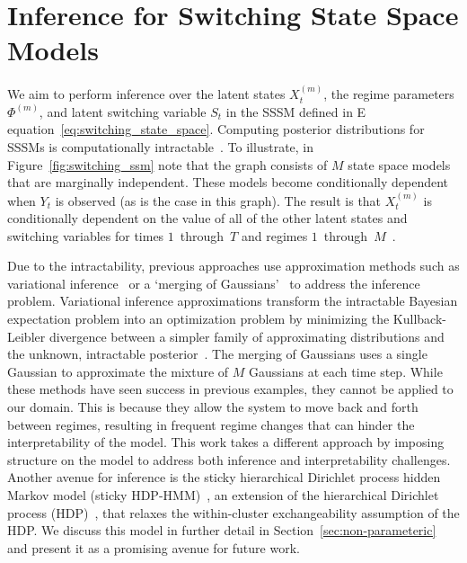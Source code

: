 \section{Inference for Switching State Space Models}\label{sec:inference_for_sssm}
We aim to perform inference over the latent states $X_t^{(m)}$, the regime parameters $\Phi^{(m)}$, and latent switching variable $S_t$ in the SSSM defined in E
equation~\ref{eq:switching_state_space}. Computing posterior distributions for SSSMs is computationally intractable~\citep{murphy2002dynamic, kim1994dynamic}. To illustrate, in Figure~\ref{fig:switching_ssm} note that the graph consists of $M$ state space models that are marginally independent. These models become conditionally dependent when $Y_t$ is observed (as is the case in this graph). The result is that $X_t^{(m)}$ is conditionally dependent on the value of all of the other latent states and switching variables for times $1$~through~$T$ and regimes $1$~through~$M$~\citep{murphy2002dynamic,ghahramani2000variational}.

Due to the intractability, previous approaches use approximation methods such as variational inference~\citep{ghahramani2000variational} or a `merging of Gaussians'~\citep{kim1999state,murphy2002dynamic} to address the inference problem. Variational inference approximations transform the intractable Bayesian expectation problem into an optimization problem by minimizing the Kullback-Leibler divergence between a simpler family of approximating distributions and the unknown, intractable posterior~\citep{attias2000variational,saul1996exploiting,saul1996mean,blei2003latent}. The merging of Gaussians uses a single Gaussian to approximate the mixture of $M$ Gaussians at each time step. While these methods have seen success in previous examples, they cannot be applied to our domain. This is because they allow the system to move back and forth between regimes, resulting in frequent regime changes that can hinder the interpretability of the model. This work takes a different approach by imposing structure on the model to address both inference and interpretability challenges. Another avenue for inference is the sticky hierarchical Dirichlet process hidden Markov model (sticky HDP-HMM)~\citep{fox2009nonparametric,fox2007hierarchical}, an extension of the hierarchical Dirichlet process (HDP)~\citep{teh2005sharing}, that relaxes the within-cluster exchangeability assumption of the HDP. We discuss this model in further detail in Section~\ref{sec:non-parameteric} and present it as a promising avenue for future work.

